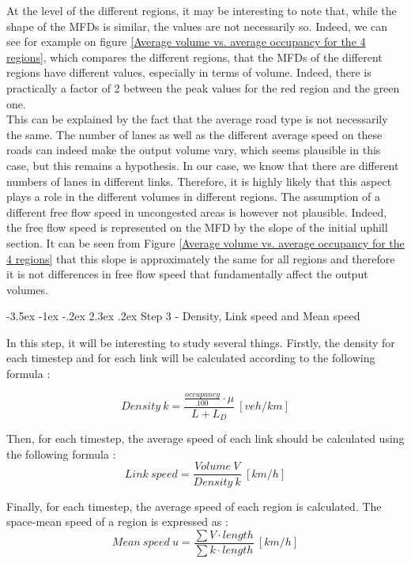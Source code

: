 \documentclass[a4paper, 12pt,oneside]{article}
\makeatletter
\renewcommand{\section}{\@startsection {section}{1}{\z@}%
             {-3.5ex \@plus -1ex \@minus -.2ex}%
             {2.3ex \@plus.2ex}%
             {\normalfont\normalsize\bfseries}}
\makeatother
\begin{document}
\smallbreak

At the level of the different regions, it may be interesting to note that, while the shape of the MFDs is similar, the values are not necessarily so. Indeed, we can see for example on figure \ref{Average volume vs. average occupancy for the 4 regions}, which compares the different regions, that the MFDs of the different regions have different values, especially in terms of volume. Indeed, there is practically a factor of 2 between the peak values for the red region and the green one.\\
This can be explained by the fact that the average road type is not necessarily the same. The number of lanes as well as the different average speed on these roads can indeed make the output volume vary, which seems plausible in this case, but this remains a hypothesis. In our case, we know that there are different numbers of lanes in different links. Therefore, it is highly likely that this aspect plays a role in the different volumes in different regions. The assumption of a different free flow speed in uncongested areas is however not plausible. Indeed, the free flow speed is represented on the MFD by the slope of the initial uphill section. It can be seen from Figure \ref{Average volume vs. average occupancy for the 4 regions} that this slope is approximately the same for all regions and therefore it is not differences in free flow speed that fundamentally affect the output volumes.


\section{Step 3 - Density, Link speed and Mean speed}

In this step, it will be interesting to study several things.
Firstly, the density for each timestep and for each link will be calculated according to the following formula : 

\begin{equation}
       Density~k = \frac{\frac{occupancy}{100}\cdot \mu}{L+L_D}~[veh/km]
    \label{density}
\end{equation}


Then, for each timestep, the average speed of each link should be calculated using the following formula :
\begin{equation}
       Link~speed =  \frac{Volume~V}{Density~k}~[km/h]
    \label{Link speed}
\end{equation}

Finally, for each timestep, the average speed of each region is calculated. The space-mean speed of a region is expressed as :
\begin{equation}
       Mean~speed~u =  \frac{\sum V \cdot length}{\sum k \cdot length}~[km/h]
    \label{Link speed}
\end{equation}
\end{document}
